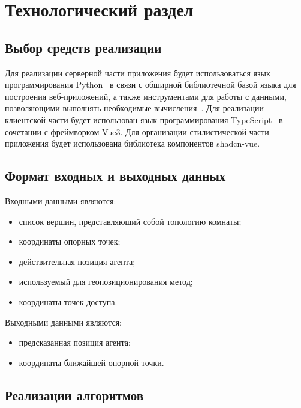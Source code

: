 \chapter{Технологический раздел}

\section{Выбор средств реализации}

Для реализации серверной части приложения будет использоваться язык программирования Python~\cite{python} в связи с обширной библиотечной базой языка для построения веб-приложений, а также инструментами для работы с данными, позволяющими выполнять необходимые вычисления~\cite{pyproblems}. Для реализации клиентской части будет использован язык программирования TypeScript~\cite{typescript} в сочетании с фреймворком Vue3. Для организации стилистической части приложения будет использована библиотека компонентов shadcn-vue.

\section{Формат входных и выходных данных}

Входными данными являются:

\begin{itemize}[label=---]
    \item список вершин, представляющий собой топологию комнаты;
    \item координаты опорных точек;
    \item действительная позиция агента;
    \item используемый для геопозиционирования метод;
    \item координаты точек доступа.
\end{itemize}

Выходными данными являются:

\begin{itemize}[label=---]
    \item предсказанная позиция агента;
    \item координаты ближайшей опорной точки.
\end{itemize}

\clearpage

\section{Реализации алгоритмов}

